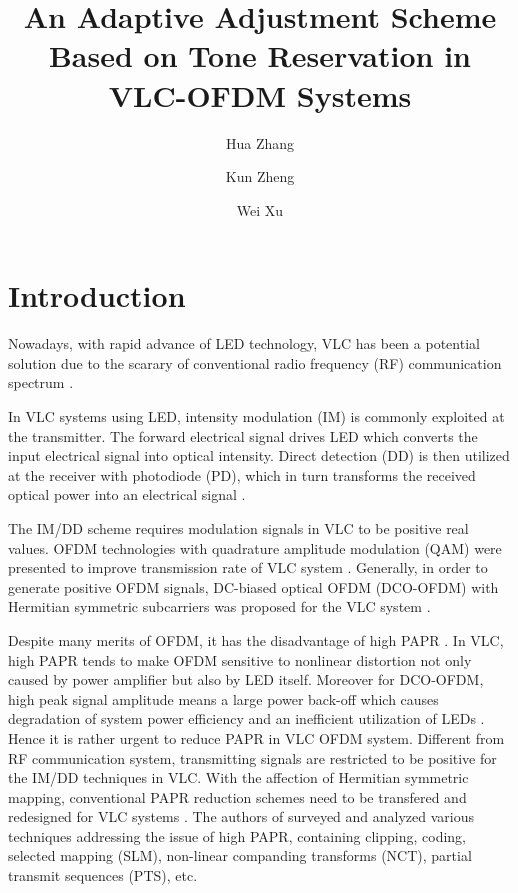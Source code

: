 \documentclass[9pt,twocolumn,twoside]{osajnl}
\title{An Adaptive Adjustment Scheme Based on Tone Reservation in VLC-OFDM Systems}
\author[1,*]{Hua Zhang}
\author[1]{Kun Zheng}
\author[1]{Wei Xu}
\affil[1]{School of Information Science and Engineering, Southeast University, No.9 St. Southeast University road, Jiangsu Nanjing, 211102}
\affil[*]{Corresponding author: Wei Xu, Hua Zhang}
\begin{document}
\maketitle

\section{Introduction}


Nowadays, with rapid advance of LED technology, VLC has been a potential 
solution due to the scarary of conventional radio frequency (RF) communication spectrum 
 \cite{o2008visible,6011734,rajbhandari2015high,elgala2007ofdm}.

In VLC systems using LED, intensity modulation (IM) is commonly exploited at the transmitter. The forward electrical signal drives LED which converts the input electrical signal into 
optical intensity. Direct detection (DD) is then utilized at the receiver with photodiode (PD), which in turn transforms the received optical power into an electrical signal 
 \cite{elgala2007ofdm,armstrong2009ofdm}.

The IM/DD scheme requires modulation signals in VLC to be positive real values. OFDM technologies with quadrature amplitude modulation (QAM) were presented to 
improve transmission rate of VLC system \cite{afgani2006visible,hranilovic2005design,fernando2011flip,lee2009pam}. Generally, in order to generate positive OFDM signals, DC-biased optical OFDM (DCO-OFDM) with Hermitian symmetric subcarriers was proposed 
for the VLC system \cite{carruthers1996multiple}.

Despite many merits of OFDM, it has the disadvantage of high PAPR \cite{parvez2010peak,zekri1999dmt}. In VLC, high PAPR tends to make OFDM sensitive to 
nonlinear distortion not only caused by power amplifier but also by LED itself. 
Moreover for DCO-OFDM, high peak signal amplitude means a large power back-off which causes degradation of system power efficiency and an inefficient utilization of LEDs \cite{elgala2009non}. 
Hence it is rather urgent to reduce PAPR in VLC OFDM system. 
Different from RF communication system, transmitting signals are restricted to be positive for the IM/DD techniques in VLC. With the affection of Hermitian symmetric mapping, conventional PAPR reduction schemes 
need to be transfered and redesigned for VLC systems \cite{yu2013peak,yu2014distributions,zhang2014papr}. The authors of \cite{han2005overview} surveyed 
and analyzed various techniques addressing the issue of high PAPR, containing clipping, coding, selected mapping (SLM), non-linear companding transforms (NCT), partial transmit sequences (PTS), etc.
\end{document}
